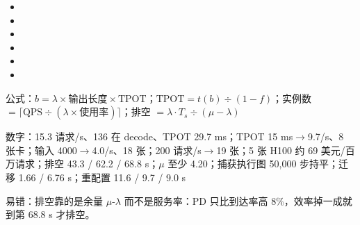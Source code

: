 \documentclass[UTF8,10.5pt,openany]{ctexbook}
\newcommand{\meta}[2]{\vspace{1pt}\begingroup\sloppy\raggedright{\sffamily\footnotesize\color{grayt}#1：#2}\par\endgroup}
\begin{document}
\begin{itemize}[leftmargin=1.35em,itemsep=2.2pt,topsep=1pt,parsep=0pt]
\item \begingroup{}\endgroup
\item \begingroup{}\endgroup
\item \begingroup{}\endgroup
\item \begingroup{}\endgroup
\item \begingroup{}\endgroup
\item \begingroup{}\endgroup
\end{itemize}
\meta{公式}{$b=\lambda\times\text{输出长度}\times\text{TPOT}$；$\text{TPOT}=t(b)\div(1-f)$；实例数 $=\lceil\text{QPS}\div(\lambda\times\text{使用率})\rceil$；排空 $=\lambda\cdot T_s\div(\mu-\lambda)$}
\meta{数字}{15.3 请求/s、136 在 decode、TPOT 29.7 ms；TPOT 15 ms$\rightarrow$9.7/s、8 张卡；输入 4000$\rightarrow$4.0/s、18 张；200 请求/s$\rightarrow$19 张；5 张 H100 约 69 美元/百万请求；排空 43.3 / 62.2 / 68.8 s；$\mu$ 至少 4.20；捕获执行图 50,000 步持平；迁移 1.66 / 6.76 s；重配置 11.6 / 9.7 / 9.0 s}
\meta{易错}{排空靠的是余量 $\mu$-$\lambda$ 而不是服务率：PD 只比到达率高 8\%，效率掉一成就到第 68.8 s 才排空。}
\end{document}

